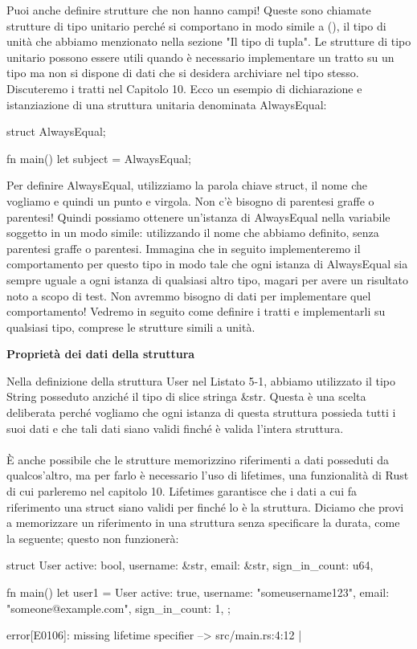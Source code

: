 \documentclass[11pt,a4paper]{article}
\begin{document}
Puoi anche definire strutture che non hanno campi! Queste sono chiamate strutture di tipo unitario perché si comportano in modo simile a (), il tipo di unità che abbiamo menzionato nella sezione "Il tipo di tupla". Le strutture di tipo unitario possono essere utili quando è necessario implementare un tratto su un tipo ma non si dispone di dati che si desidera archiviare nel tipo stesso. Discuteremo i tratti nel Capitolo 10. Ecco un esempio di dichiarazione e istanziazione di una struttura unitaria denominata AlwaysEqual:
\begin{rust}
struct AlwaysEqual;

fn main() {
    let subject = AlwaysEqual;
}
\end{rust}
Per definire AlwaysEqual, utilizziamo la parola chiave struct, il nome che vogliamo e quindi un punto e virgola. Non c'è bisogno di parentesi graffe o parentesi! Quindi possiamo ottenere un'istanza di AlwaysEqual nella variabile soggetto in un modo simile: utilizzando il nome che abbiamo definito, senza parentesi graffe o parentesi. Immagina che in seguito implementeremo il comportamento per questo tipo in modo tale che ogni istanza di AlwaysEqual sia sempre uguale a ogni istanza di qualsiasi altro tipo, magari per avere un risultato noto a scopo di test. Non avremmo bisogno di dati per implementare quel comportamento! Vedremo in seguito come definire i tratti e implementarli su qualsiasi tipo, comprese le strutture simili a unità.

   \begin{mdframed}
\centerline{\textbf{Proprietà dei dati della struttura}}
Nella definizione della struttura User nel Listato 5-1, abbiamo utilizzato il tipo String posseduto anziché il tipo di slice stringa \&str. Questa è una scelta deliberata perché vogliamo che ogni istanza di questa struttura possieda tutti i suoi dati e che tali dati siano validi finché è valida l'intera struttura.\\
\\
È anche possibile che le strutture memorizzino riferimenti a dati posseduti da qualcos'altro, ma per farlo è necessario l'uso di lifetimes, una funzionalità di Rust di cui parleremo nel capitolo 10. Lifetimes garantisce che i dati a cui fa riferimento una struct siano validi per finché lo è la struttura. Diciamo che provi a memorizzare un riferimento in una struttura senza specificare la durata, come la seguente; questo non funzionerà:
\begin{rust}
struct User {
    active: bool,
    username: &str,
    email: &str,
    sign_in_count: u64,
}

fn main() {
    let user1 = User {
        active: true,
        username: "someusername123",
        email: "someone@example.com",
        sign_in_count: 1,
    };
}

error[E0106]: missing lifetime specifier
 --> src/main.rs:4:12
  |
\end{rust}
\end{mdframed}
\end{document}
